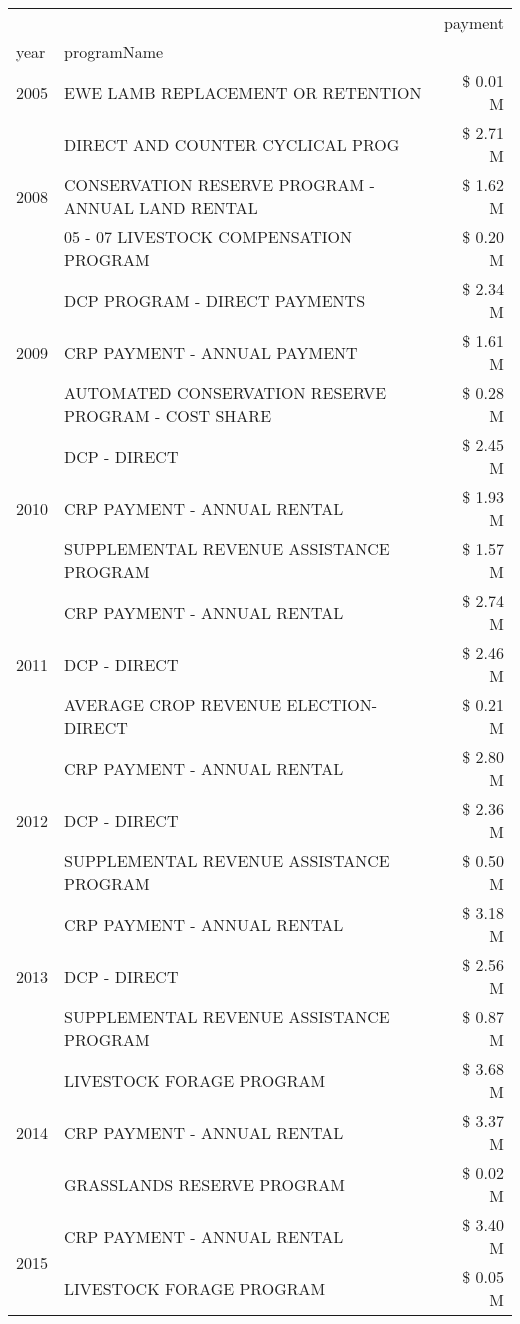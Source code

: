 \begin{tabular}{llr}
\toprule
 &  & payment \\
year & programName &  \\
\midrule
2005 & EWE LAMB REPLACEMENT OR RETENTION & \$ 0.01 M \\
\cline{1-3}
\multirow[t]{3}{*}{2008} & DIRECT AND COUNTER CYCLICAL PROG & \$ 2.71 M \\
 & CONSERVATION RESERVE PROGRAM - ANNUAL LAND RENTAL & \$ 1.62 M \\
 & 05 - 07 LIVESTOCK COMPENSATION PROGRAM & \$ 0.20 M \\
\cline{1-3}
\multirow[t]{3}{*}{2009} & DCP PROGRAM - DIRECT PAYMENTS & \$ 2.34 M \\
 & CRP PAYMENT - ANNUAL PAYMENT & \$ 1.61 M \\
 & AUTOMATED CONSERVATION RESERVE PROGRAM - COST SHARE & \$ 0.28 M \\
\cline{1-3}
\multirow[t]{3}{*}{2010} & DCP - DIRECT & \$ 2.45 M \\
 & CRP PAYMENT - ANNUAL RENTAL & \$ 1.93 M \\
 & SUPPLEMENTAL REVENUE ASSISTANCE PROGRAM & \$ 1.57 M \\
\cline{1-3}
\multirow[t]{3}{*}{2011} & CRP PAYMENT - ANNUAL RENTAL & \$ 2.74 M \\
 & DCP - DIRECT & \$ 2.46 M \\
 & AVERAGE CROP REVENUE ELECTION-DIRECT & \$ 0.21 M \\
\cline{1-3}
\multirow[t]{3}{*}{2012} & CRP PAYMENT - ANNUAL RENTAL & \$ 2.80 M \\
 & DCP - DIRECT & \$ 2.36 M \\
 & SUPPLEMENTAL REVENUE ASSISTANCE PROGRAM & \$ 0.50 M \\
\cline{1-3}
\multirow[t]{3}{*}{2013} & CRP PAYMENT - ANNUAL RENTAL & \$ 3.18 M \\
 & DCP - DIRECT & \$ 2.56 M \\
 & SUPPLEMENTAL REVENUE ASSISTANCE PROGRAM & \$ 0.87 M \\
\cline{1-3}
\multirow[t]{3}{*}{2014} & LIVESTOCK FORAGE PROGRAM & \$ 3.68 M \\
 & CRP PAYMENT - ANNUAL RENTAL & \$ 3.37 M \\
 & GRASSLANDS RESERVE PROGRAM & \$ 0.02 M \\
\cline{1-3}
\multirow[t]{3}{*}{2015} & CRP PAYMENT - ANNUAL RENTAL & \$ 3.40 M \\
 & LIVESTOCK FORAGE PROGRAM & \$ 0.05 M \\

\end{tabular}
